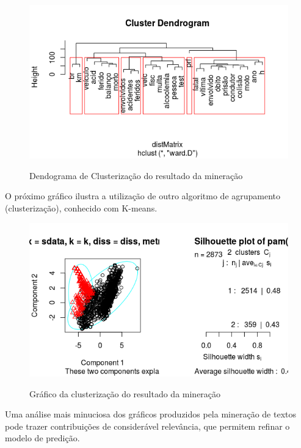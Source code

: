 \begin{figure}
\centering
\caption{Dendograma de Clusterização do resultado da mineração}
\includegraphics[width=0.7\linewidth]{Figuras/Twitter//Cluster}
\label{fig:Cluster}
\end{figure}

O próximo gráfico ilustra a utilização de outro algoritmo de agrupamento (clusterização), conhecido com K-means. 

\begin{figure}
\centering
\caption{Gráfico da clusterização do resultado da mineração}
\includegraphics[width=0.7\linewidth]{Figuras/Twitter/Cluster2}
\label{fig:Cluster2}
\end{figure}

Uma análise mais minuciosa dos gráficos produzidos pela mineração de textos pode trazer contribuições de considerável relevância, que permitem refinar o modelo de predição.

